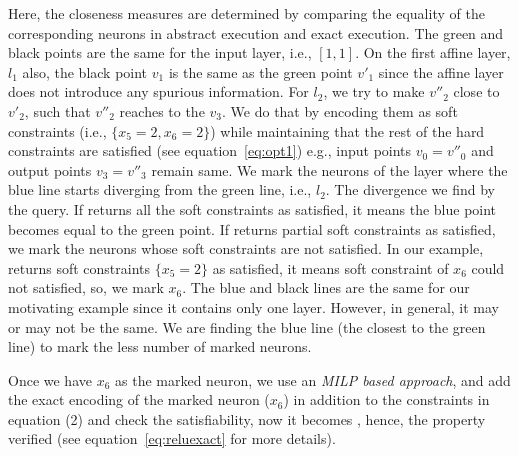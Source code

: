 {\color{red} Here, the closeness measures are determined by comparing the equality of the corresponding neurons in abstract execution and exact execution.}
The green and black points are the same for the input layer, i.e., $[1,1]$. On the first affine layer, $l_1$ 
also, the black point $v_1$ is the same as the green point $v'_1$ since the affine layer does not introduce any spurious information. 
For $l_2$, we try to make $v''_2$ close to $v'_2$, such that $v''_2$ reaches to the $v_3$. We do that by encoding 
them as soft constraints (i.e.,  $\{x_5=2, x_6=2\}$) 
while maintaining that the rest of the hard constraints are satisfied (see equation~\ref{eq:opt1})
e.g., input points $v_0=v''_0$ and output points $v_3=v''_3$ remain same. 
We mark the neurons of the layer where the blue line starts diverging from the green line, i.e., $l_2$. 
The divergence we find by the \maxsat{} query. If \maxsat{} returns all the soft constraints as satisfied, it means
the blue point becomes equal to the green point. If \maxsat{} returns partial soft constraints as satisfied, 
we mark the neurons whose soft constraints are not satisfied. In our example, \maxsat{} returns 
soft constraints $\{x_5=2\}$ as satisfied, it means soft constraint of $x_6$ could not satisfied, so, we mark $x_6$.
The blue and black lines are the same for our motivating example since it contains only one \relu{} layer. 
However, in general, it may or may not be the same. We are finding the blue line (the closest to the green line) to mark the 
less number of marked neurons. 




\noindent  
{}\;\;
  \begin{minipage}{0.42\linewidth}
Once we have  $x_6$ as the marked neuron, we use an {\em MILP based approach}, and add the exact encoding of the marked neuron ($x_6$) in addition to the constraints in equation (2) %
and check the satisfiability, now it becomes \unsat{}, hence, the property verified (see equation~\ref{eq:reluexact} for more details).
\end{minipage}

